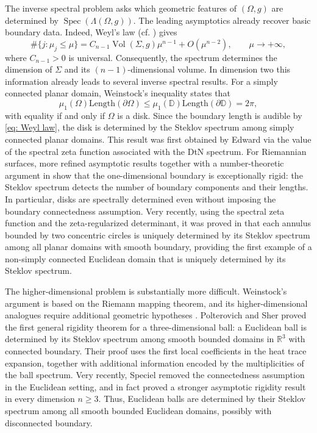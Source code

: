 \documentclass[11pt]{amsart}
\newcommand{\Vol}{\operatorname{Vol}}
\newcommand{\Spec}{\operatorname{Spec}}
\theoremstyle{definition}
\numberwithin{equation}{section}
\begin{document}
	The inverse spectral problem asks which geometric features of $(\Omega,g)$ are determined by $\Spec(\Lambda(\Omega,g))$.  The leading asymptotics already recover basic boundary data.  Indeed, Weyl's law (cf. \cite[Chap. 29]{hormanderAnalysisLinearPartial2009}) gives
	\begin{equation}
		\label{eq: Weyl law}
		\#\{j:\mu_j\leq \mu\}
		=C_{n-1}\Vol(\Sigma,g)\mu^{n-1}+O(\mu^{n-2}),
		\qquad \mu\to+\infty,
	\end{equation}
	where $C_{n-1}>0$ is universal.  Consequently, the spectrum determines the dimension of $\Sigma$ and its $(n-1)$-dimensional volume.  In dimension two this information already leads to several inverse spectral results.  For a simply connected planar domain, Weinstock's inequality \cite{weinstockInequalitiesClassicalEigenvalue1954} states that
	\[
	\mu_1(\Omega)\mathrm{Length}(\partial\Omega)
	\leq
	\mu_1(\mathbb D)\mathrm{Length}(\partial\mathbb D)
	=2\pi,
	\]
	with equality if and only if $\Omega$ is a disk.  Since the boundary length is audible by \eqref{eq: Weyl law}, the disk is determined by the Steklov spectrum among simply connected planar domains. This result was first obtained by Edward \cite{edwardInverseSpectralResult1993} via the value of the spectral zeta function associated with the DtN spectrum. For Riemannian surfaces, more refined asymptotic results together with a number-theoretic argument in \cite{girouardSteklovSpectrumSurfaces2014} show that the one-dimensional boundary is exceptionally rigid: the Steklov spectrum detects the number of boundary components and their lengths.  In particular, disks are spectrally determined even without imposing the boundary connectedness assumption.
	Very recently, using the spectral zeta function and the zeta-regularized determinant, it was proved in \cite{jinSteklovSpectralGeometry2026} that  each annulus bounded by two concentric circles is uniquely determined by its Steklov spectrum among all planar domains with smooth boundary,  providing the first example of a non-simply connected Euclidean domain that is uniquely determined by its Steklov spectrum. 
	
	
	The higher-dimensional problem is substantially more difficult.  Weinstock's argument is based on the Riemann mapping theorem, and its higher-dimensional analogues require additional geometric hypotheses \cite{bucurWeinstockInequalityHigher2021}.  Polterovich and Sher \cite{polterovichHeatInvariantsSteklov2015} proved the first general rigidity theorem for a three-dimensional ball: a Euclidean ball is determined by its Steklov spectrum among smooth bounded domains in $\mathbb R^3$ with connected boundary.  Their proof uses the first local coefficients in the heat trace expansion, together with additional information encoded by the multiplicities of the ball spectrum.  Very recently, Speciel \cite{specielSteklovRigidityEuclidean2026} removed the connectedness assumption in the Euclidean setting, and in fact proved a stronger asymptotic rigidity result in every dimension $n\geq 3$. Thus, Euclidean balls are determined by their Steklov spectrum among all smooth bounded Euclidean domains, possibly with disconnected boundary. 
	
\end{document}
